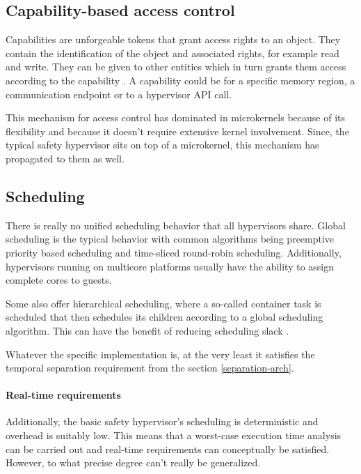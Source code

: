 \subsection{Capability-based access control}
Capabilities are unforgeable tokens that grant access rights to an object. They contain the identification of the object and associated rights, for example read and write.
They can be given to other entities which in turn grants them access according to the capability \cite{Levy.1984}. A capability could be for a specific memory region, a communication endpoint or to a hypervisor \acrshort{API} call.

This mechanism for access control has dominated in microkernels because of its flexibility and because it doesn't require extensive kernel involvement. Since, the typical safety hypervisor sits on top of a microkernel, this mechanism has propagated to them as well.

\subsection{Scheduling}
There is really no unified scheduling behavior that all hypervisors share. Global scheduling is the typical behavior with common algorithms being preemptive priority based scheduling and time-sliced round-robin scheduling. Additionally, hypervisors running on multicore platforms usually have the ability to assign complete cores to guests.

Some also offer hierarchical scheduling, where a so-called container task is scheduled that then schedules its children according to a global scheduling algorithm. This can have the benefit of reducing scheduling slack \cite{MalcolmS.Mollison.2010}. 

Whatever the specific implementation is, at the very least it satisfies the temporal separation requirement from the section \ref{separation-arch}. 

\paragraph{Real-time requirements}
Additionally, the basic safety hypervisor's scheduling is deterministic and overhead is suitably low. This means that a worst-case execution time analysis can be carried out and real-time requirements can conceptually be satisfied. However, to what precise degree can't really be generalized.
\begin{comment}
\subsection{Static configuration}
Any mechanism to increase a guests rights at runtime poses the risk of exploitation, be it accidental or purposeful. That is why these systems are typically statically configured and if configuration runtime is at all possible, it is restricted to reducing privilege. For example, a guest that is allowed to spawn other guests may give them his own rights or less than his own but never more.
\end{comment}

